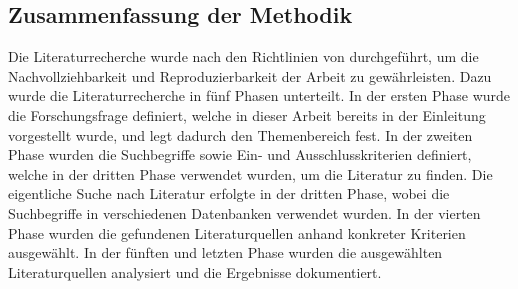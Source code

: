 \subsection*{Zusammenfassung der Methodik}
Die Literaturrecherche wurde nach den Richtlinien von \citeauthor{conf/ecis/BrockeSNRPC09} durchgeführt, um die Nachvollziehbarkeit und Reproduzierbarkeit der Arbeit zu gewährleisten.
Dazu wurde die Literaturrecherche in fünf Phasen unterteilt.
In der ersten Phase wurde die Forschungsfrage definiert, welche in dieser Arbeit bereits in der Einleitung vorgestellt wurde, und legt dadurch den Themenbereich fest.
In der zweiten Phase wurden die Suchbegriffe sowie Ein- und Ausschlusskriterien definiert, welche in der dritten Phase verwendet wurden, um die Literatur zu finden.
Die eigentliche Suche nach Literatur erfolgte in der dritten Phase, wobei die Suchbegriffe in verschiedenen Datenbanken verwendet wurden.
In der vierten Phase wurden die gefundenen Literaturquellen anhand konkreter Kriterien ausgewählt.
In der fünften und letzten Phase wurden die ausgewählten Literaturquellen analysiert und die Ergebnisse dokumentiert.